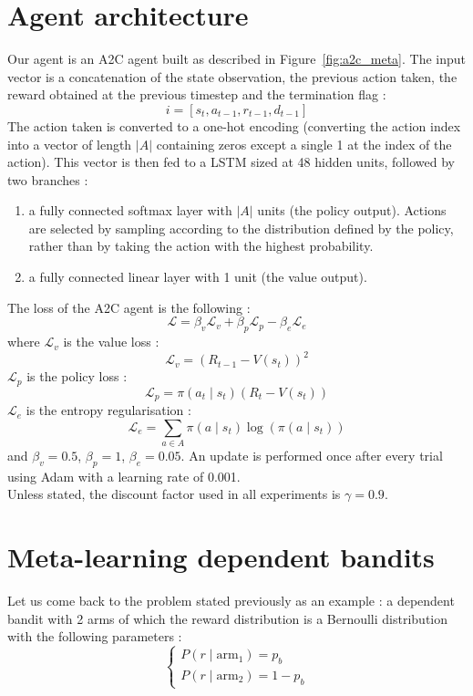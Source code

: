 \section{Agent architecture}
Our agent is an A2C agent built as described in Figure~\ref{fig:a2c_meta}.
The input vector is a concatenation of the state observation, the previous
action taken, the reward obtained at the previous timestep and the termination
flag :
$$ i = [s_t, a_{t-1}, r_{t-1}, d_{t-1}] $$
The action taken is converted to a one-hot encoding (converting the action
index into a vector of length $|A|$ containing zeros except a single 1 at the
index of the action). This vector is then fed to a LSTM sized at 48 hidden
units, followed by two branches :
\begin{enumerate}
	\item a fully connected softmax layer with $|A|$ units (the policy
		output). Actions are selected by sampling according to the
		distribution defined by the policy, rather than by taking the
		action with the highest probability.
	\item a fully connected linear layer with 1 unit (the value output).
\end{enumerate}
The loss of the A2C agent is the following : 
$$ \mathcal{L} = \beta_v \mathcal{L}_v + \beta_p \mathcal{L}_p - \beta_e 
 \mathcal{L}_e $$
where $\mathcal{L}_v$ is the value loss : 
$$ \mathcal{L}_v = (R_{t-1} - V(s_t))^2$$
$\mathcal{L}_p$ is the policy loss : 
$$ \mathcal{L}_p = \pi(a_t \mid s_t) (R_t - V(s_t))$$
$\mathcal{L}_e$ is the entropy regularisation : 
$$ \mathcal{L}_e = \sum\limits_{a \in A}\pi(a \mid s_t)\log(\pi(a \mid s_t))$$
and $\beta_v = 0.5$, $\beta_p = 1$, $\beta_e = 0.05$. An update is performed
once after every trial using Adam \cite{adam} with a learning rate of 0.001.\\

Unless stated, the discount factor used in all experiments is $\gamma=0.9$. 


\section{Meta-learning dependent bandits}
Let us come back to the problem stated previously as an example : a dependent
bandit with 2 arms of which the reward distribution is a Bernoulli distribution
with the following parameters : 
$$ \begin{cases} P(r \mid \text{arm}_1) = p_b \\ 
P(r \mid \text{arm}_2) = 1 - p_b  \end{cases} $$

